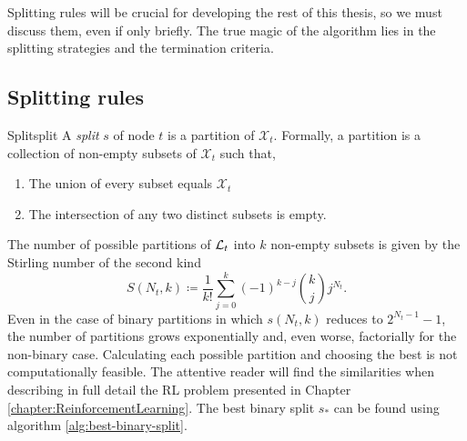 Splitting rules will be crucial for developing the rest of this thesis, so we
must discuss them, even if only briefly. The true magic of the algorithm lies in
the splitting strategies and the termination criteria.

\subsection{Splitting rules}

\begin{dfn}{Split}{split}
    A \emph{split} $s$ of node $t$ is a partition of $\mathcal{X}_t$. Formally, a partition is a collection of non-empty subsets of $\mathcal{X}_t$ such that,
    \begin{enumerate}
        \item The union of every subset equals $\mathcal{X}_t$
        \item The intersection of any two distinct subsets is empty.
    \end{enumerate}
\end{dfn}

The number of possible partitions of $\mathcal{L}_t$ into $k$ non-empty subsets is given
by the Stirling number of the second kind \cite{louppe2014}
\begin{equation*}
    S(N_t, k) \coloneqq \frac{1}{k!} \sum_{j=0}^{k} (-1)^{k-j} \binom{k}{j} j^{N_t}.
\end{equation*}
Even in the case of binary partitions in which $s(N_t, k)$ reduces to $2^{N_t
-1}-1$, the number of partitions grows exponentially and, even worse,
factorially for the non-binary case. Calculating each possible partition and
choosing the best is not computationally feasible. The attentive reader will
find the similarities when describing in full detail the RL problem presented in
Chapter \ref{chapter:ReinforcementLearning}. The best binary split $s_*$ can be
found using algorithm \ref{alg:best-binary-split}.

\begin{algorithm}
    \caption[Best split for node $t$ algorithm]{Find best binary split $s_*$ for
        node $t$ \cite[Ch.~3.6.3]{louppe2014}.}
    \label{alg:best-binary-split}
\end{algorithm}

